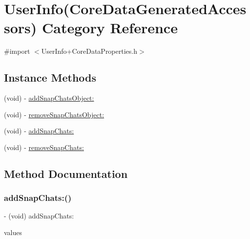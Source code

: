 \hypertarget{category_user_info_07_core_data_generated_accessors_08}{}\section{User\+Info(Core\+Data\+Generated\+Accessors) Category Reference}
\label{category_user_info_07_core_data_generated_accessors_08}


{\ttfamily \#import $<$User\+Info+\+Core\+Data\+Properties.\+h$>$}

\subsection*{Instance Methods}
\begin{DoxyCompactItemize}
\item 
(void) -\/ \hyperlink{category_user_info_07_core_data_generated_accessors_08_a60a99590b470d8c11ee23e47ac20b09a}{add\+Snap\+Chats\+Object\+:}
\item 
(void) -\/ \hyperlink{category_user_info_07_core_data_generated_accessors_08_a8ac63ce90e9911d188c01c95ec18b638}{remove\+Snap\+Chats\+Object\+:}
\item 
(void) -\/ \hyperlink{category_user_info_07_core_data_generated_accessors_08_a7f9a4fea0aa960f777e6f5763f6de9f0}{add\+Snap\+Chats\+:}
\item 
(void) -\/ \hyperlink{category_user_info_07_core_data_generated_accessors_08_a7b335565ece5b09bb633af92eeaf47eb}{remove\+Snap\+Chats\+:}
\end{DoxyCompactItemize}


\subsection{Method Documentation}
\hypertarget{category_user_info_07_core_data_generated_accessors_08_a7f9a4fea0aa960f777e6f5763f6de9f0}{}\label{category_user_info_07_core_data_generated_accessors_08_a7f9a4fea0aa960f777e6f5763f6de9f0} 
\subsubsection{\texorpdfstring{add\+Snap\+Chats\+:()}{addSnapChats:()}}
{\footnotesize\ttfamily -\/ (void) add\+Snap\+Chats\+: \begin{DoxyParamCaption}\item[{(N\+S\+Set$<$ \hyperlink{interface_snap}{Snap} $\ast$ $>$ $\ast$)}]{values }\end{DoxyParamCaption}}



